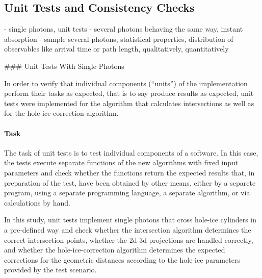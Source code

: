 
\subsection{Unit Tests and Consistency Checks}
\label{sec:unit_tests_and_cross_checks}


- single photons, unit tests
- several photons behaving the same way, instant absorption
- sample several photons, statistical properties, distribution of observables like arrival time or path length, qualitatively, quantitatively

### Unit Tests With Single Photons
\label{sec:unit_tests}

In order to verify that individual components (``units'') of the implementation perform their tasks as expected, that is to say produce results as expected, unit tests were implemented for the algorithm that calculates intersections as well as for the hole-ice-correction algorithm.


\paragraph{Task} The task of unit tests is to test individual components of a software. In this case, the tests execute separate functions of the new algorithms with fixed input parameters and check whether the functions return the expected results that, in preparation of the test, have been obtained by other means, either by a separete program, using a separate programming language, a separate algorithm, or via calculations by hand.

In this study, unit tests implement single photons that cross hole-ice cylinders in a pre-defined way and check whether the intersection algorithm determines the correct intersection points, whether the 2d-3d projections are handled correctly, and whether the hole-ice-correction algorithm determines the expected corrections for the geometric distances according to the hole-ice parameters provided by the test scenario.


